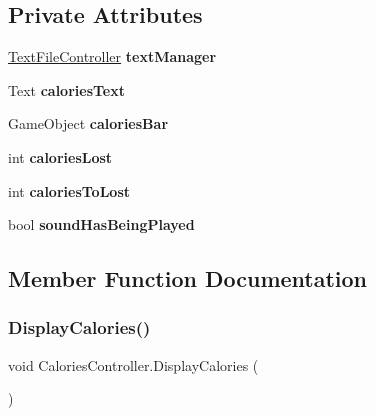 \subsection*{Private Attributes}
\begin{DoxyCompactItemize}
\item 
\mbox{\label{class_calories_controller_a88787ace7545e3bd079c997427db3f0c}} 
\mbox{\hyperlink{class_text_file_controller}{Text\+File\+Controller}} {\bfseries text\+Manager}
\item 
\mbox{\label{class_calories_controller_a5b032d293e6a11eb099fc21b85a203e8}} 
Text {\bfseries calories\+Text}
\item 
\mbox{\label{class_calories_controller_a8b50599ed392d0cca9072877fca1240c}} 
Game\+Object {\bfseries calories\+Bar}
\item 
\mbox{\label{class_calories_controller_ae4b78a76652d2a4b8a806d7da3129b5e}} 
int {\bfseries calories\+Lost}
\item 
\mbox{\label{class_calories_controller_ac0d19ef83375ae3475b537afcf278fff}} 
int {\bfseries calories\+To\+Lost}
\item 
\mbox{\label{class_calories_controller_aeb6c55820b4bfacba6e36f0f3df7af9c}} 
bool {\bfseries sound\+Has\+Being\+Played}
\end{DoxyCompactItemize}


\subsection{Member Function Documentation}
\mbox{\label{class_calories_controller_a1e98a94df30539c1ab3c2b7b6acc3003}} 
\subsubsection{\texorpdfstring{Display\+Calories()}{DisplayCalories()}}
{\footnotesize\ttfamily void Calories\+Controller.\+Display\+Calories (\begin{DoxyParamCaption}{ }\end{DoxyParamCaption})\hspace{0.3cm}{\ttfamily [private]}}

